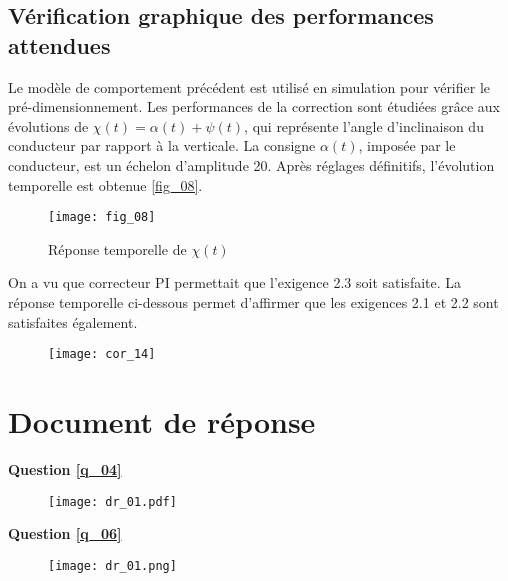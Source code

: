 \subsection{Vérification graphique des performances attendues}
\ifprof
\else
Le modèle de comportement précédent est utilisé en simulation pour vérifier le pré-dimensionnement. Les performances de la correction sont étudiées grâce aux évolutions de $\chi(t)=\alpha(t)+\psi(t)$, qui représente l’angle d’inclinaison du conducteur par rapport à la verticale. La consigne $\alpha(t)$, imposée par le conducteur, est un échelon d’amplitude 20\degres. Après réglages définitifs, l’évolution temporelle est obtenue \autoref{fig_08}. 
\fi

\ifprof
\else
\begin{figure}[H]
\centering
\texttt{[image: fig\_08]}
\caption{Réponse temporelle de $\chi(t)$ \label{fig_08}}
\end{figure}
\fi

\ifprof
\begin{corrige}

On a vu que correcteur PI permettait que l'exigence 2.3 soit satisfaite. La réponse temporelle ci-dessous permet d'affirmer que les exigences 2.1 et 2.2 sont satisfaites également.


\begin{figure}[H]
\centering
\texttt{[image: cor\_14]}
\end{figure}

\end{corrige}
\else
\fi


\ifprof
\else

\newpage 
\section*{Document de réponse}

\textbf{Question \ref{q_04}}

\begin{figure}[H]
\centering
\texttt{[image: dr\_01.pdf]}
\end{figure}

\textbf{Question \ref{q_06}}
\begin{figure}[H]
\centering
\texttt{[image: dr\_01.png]}
\end{figure}


